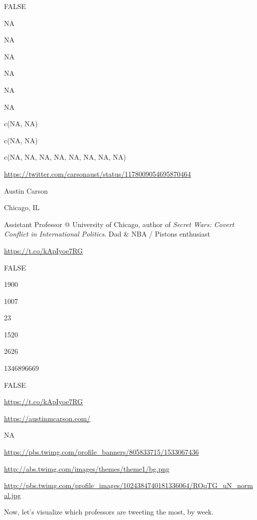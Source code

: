 \documentclass[]{book}
\newenvironment{Shaded}{\begin{snugshade}}{\end{snugshade}}
\newcommand{\KeywordTok}[1]{\textcolor[rgb]{0.13,0.29,0.53}{\textbf{#1}}}
\newcommand{\DataTypeTok}[1]{\textcolor[rgb]{0.13,0.29,0.53}{#1}}
\newcommand{\StringTok}[1]{\textcolor[rgb]{0.31,0.60,0.02}{#1}}
\newcommand{\OperatorTok}[1]{\textcolor[rgb]{0.81,0.36,0.00}{\textbf{#1}}}
\newcommand{\NormalTok}[1]{#1}
\begin{document}
FALSE

NA

NA

NA

NA

NA

NA

c(NA, NA)

c(NA, NA)

c(NA, NA, NA, NA, NA, NA, NA, NA)

\url{https://twitter.com/carsonaust/status/1178009054695870464}

Austin Carson

Chicago, IL

Assistant Professor @ University of Chicago, author of \emph{Secret
Wars: Covert Conflict in International Politics}. Dad \& NBA / Pistons
enthusiast

\url{https://t.co/kApIyoe7RG}

FALSE

1900

1007

23

1520

2626

1346896669

FALSE

\url{https://t.co/kApIyoe7RG}

\url{https://austinmcarson.com/}

NA

\url{https://pbs.twimg.com/profile_banners/805833715/1533067436}

\url{http://abs.twimg.com/images/themes/theme1/bg.png}

\url{http://pbs.twimg.com/profile_images/1024384740181336064/ROqTG_uN_normal.jpg}

Now, let's visualize which professors are tweeting the most, by week.

\begin{Shaded}
\end{Shaded}
\end{document}
